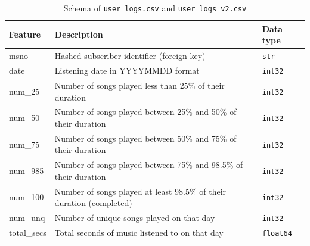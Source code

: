 \documentclass{article}
\begin{document}
\begin{table}[H]
\centering
\renewcommand{\arraystretch}{1.3}
\begin{tabularx}{\textwidth}{|l|X|l|}
\hline
\textbf{Feature} & \textbf{Description} & \textbf{Data type} \\ \hline
msno        & Hashed subscriber identifier (foreign key) & \texttt{str} \\ \hline
date        & Listening date in YYYYMMDD format & \texttt{int32} \\ \hline
num\_25     & Number of songs played less than 25\% of their duration & \texttt{int32} \\ \hline
num\_50     & Number of songs played between 25\% and 50\% of their duration & \texttt{int32} \\ \hline
num\_75     & Number of songs played between 50\% and 75\% of their duration & \texttt{int32} \\ \hline
num\_985    & Number of songs played between 75\% and 98.5\% of their duration & \texttt{int32} \\ \hline
num\_100    & Number of songs played at least 98.5\% of their duration (completed) & \texttt{int32} \\ \hline
num\_unq    & Number of unique songs played on that day & \texttt{int32} \\ \hline
total\_secs & Total seconds of music listened to on that day & \texttt{float64} \\ \hline
\end{tabularx}
\caption{Schema of \texttt{user\_logs.csv} and \texttt{user\_logs\_v2.csv}}
\label{tab:schema_logs}
\end{table}
\end{document}
